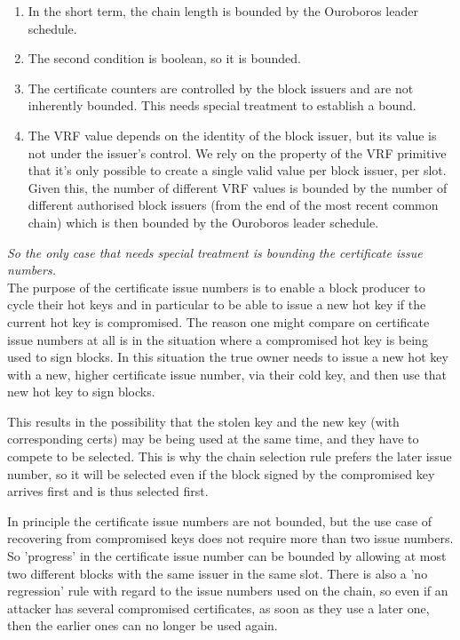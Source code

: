 \documentclass[11pt,a4paper]{article}
\begin{document}
\begin{enumerate}
  \item In the short term, the chain length is bounded by the Ouroboros leader schedule.
  \item The second condition is boolean, so it is bounded.
  \item The certificate counters are controlled by the block issuers and are not inherently bounded. This needs special treatment to establish a bound.
  \item The VRF value depends on the identity of the block issuer, but its value is not under the issuer's control. We rely on the property of the VRF primitive that it's only possible to create a single valid value per block issuer, per slot. Given this, the number of different VRF values is bounded by the number of different authorised block issuers (from the end of the most recent common chain) which is then bounded by the Ouroboros leader schedule.
\end{enumerate}

\emph{So the only case that needs special treatment is bounding the certificate issue numbers.} \\

The purpose of the certificate issue numbers is to enable a block producer to
cycle their hot keys and in particular to be able to issue a new hot key if the
current hot key is compromised. The reason one might compare on certificate issue
numbers at all is in the situation where a compromised hot key is being used
to sign blocks. In this situation the true owner needs to issue a new hot key
with a new, higher certificate issue number, via their cold key, and then 
use that new hot key to sign blocks. 

This results in the possibility that the stolen key and the new key (with corresponding certs) 
may be being used at the same time, and they have to compete to be selected. This is why the 
chain selection rule prefers the later issue number, so it will be selected even if the block 
signed by the compromised key arrives first and is thus selected first.

In principle the certificate issue numbers are not bounded, but the use case
of recovering from compromised keys does not require more than two issue
numbers. So 'progress' in the certificate issue number can be bounded by
allowing at most two different blocks with the same issuer in the same slot.
There is also a 'no regression' rule with regard to the issue numbers used on the chain, so
even if an attacker has several compromised certificates, as soon as they
use a later one, then the earlier ones can no longer be used again.
\end{document}

